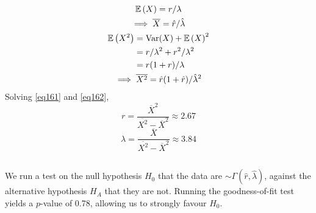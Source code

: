 \documentclass[twocolumn]{article}
\numberwithin{equation}{section}
\begin{document}
\subsection{}
\begin{gather}
\mathbb{E}\left(X\right)=r/\lambda\nonumber\\
\implies \overline X=\hat r/\hat \lambda\label{eq161}\\
\begin{aligned}
\mathbb{E}\left(X^2\right)&=\text{Var}(X)+\mathbb{E}\left(X\right)^2\\
&=r/\lambda^2+r^2/\lambda^2\\
&=r(1+r)/\lambda\\
\end{aligned}\nonumber\\
\implies \overline{X^2}=\hat r(1+\hat r)/{\hat{\lambda}}^2\label{eq162}
\end{gather}
Solving \ref{eq161} and \ref{eq162},
\[
r=\frac{\overline{X}^2}{\overline{X^2}-\overline{X}^2}\approx 2.67
\]\[
\lambda=\frac{\overline{X}}{\overline{X^2}-\overline{X}^2}\approx 3.84
\]

\subsection{}
We run a test on the null hypothesis $H_0$ that the data are $\sim\Gamma(\hat r,\hat\lambda)$, against the alternative hypothesis $H_A$ that they are not. Running the goodness-of-fit test yields a $p$-value of 0.78, allowing us to strongly favour $H_0$.

\subsection{}

\end{document}
